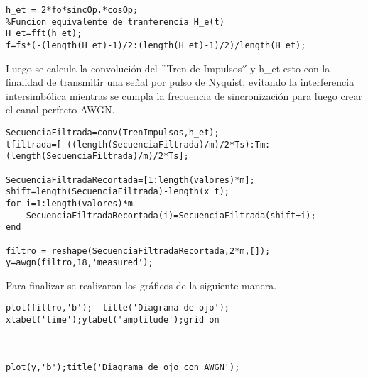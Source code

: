 \begin{lstlisting}[language=mat]
%Respuesta impulso equivalente h_e(t)
h_et = 2*fo*sincOp.*cosOp;
%Funcion equivalente de tranferencia H_e(t)
H_et=fft(h_et);
f=fs*(-(length(H_et)-1)/2:(length(H_et)-1)/2)/length(H_et);
\end{lstlisting}


Luego se calcula la convolución del $"$Tren  de Impulsos$''$ y h\_et esto con la finalidad de transmitir  una señal por pulso de Nyquist, evitando la interferencia intersimbólica mientras se cumpla la frecuencia de sincronización para luego crear el canal perfecto AWGN.

\begin{lstlisting}[language=mat]
SecuenciaFiltrada=conv(TrenImpulsos,h_et);
tfiltrada=[-((length(SecuenciaFiltrada)/m)/2*Ts):Tm:(length(SecuenciaFiltrada)/m)/2*Ts];

SecuenciaFiltradaRecortada=[1:length(valores)*m];
shift=length(SecuenciaFiltrada)-length(x_t);
for i=1:length(valores)*m
    SecuenciaFiltradaRecortada(i)=SecuenciaFiltrada(shift+i);
end

filtro = reshape(SecuenciaFiltradaRecortada,2*m,[]);
y=awgn(filtro,18,'measured'); 
\end{lstlisting}


Para finalizar  se realizaron los gráficos de la siguiente manera.

\begin{lstlisting}[language=mat]
plot(filtro,'b');  title('Diagrama de ojo'); xlabel('time');ylabel('amplitude');grid on



plot(y,'b');title('Diagrama de ojo con AWGN');
\end{lstlisting}


        
        
        
    